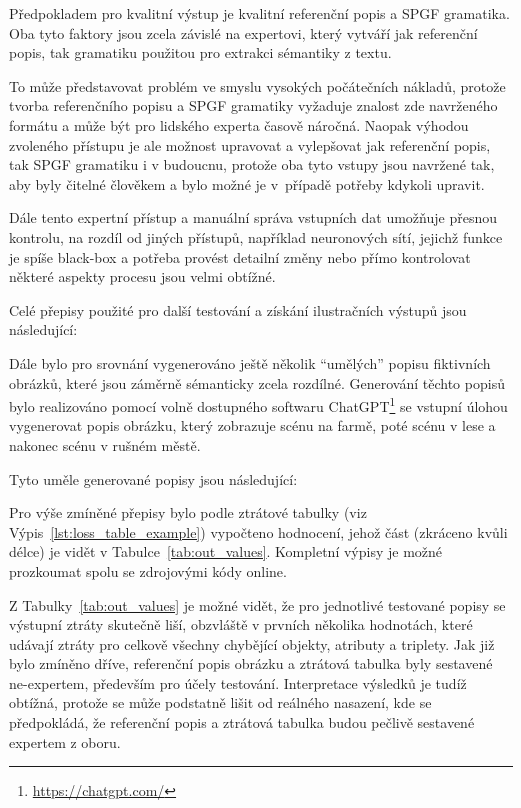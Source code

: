 Předpokladem pro kvalitní výstup je kvalitní referenční popis a SPGF gramatika.
Oba tyto faktory jsou zcela závislé na expertovi, který vytváří jak referenční popis, tak gramatiku použitou pro extrakci sémantiky z textu.

To může představovat problém ve smyslu vysokých počátečních nákladů, protože tvorba referenčního popisu a SPGF gramatiky
vyžaduje znalost zde navrženého formátu a může být pro lidského experta časově náročná.
Naopak výhodou zvoleného přístupu je ale možnost upravovat a vylepšovat jak referenční popis, tak SPGF gramatiku i v budoucnu,
protože oba tyto vstupy jsou navržené tak, aby byly čitelné člověkem a bylo možné je v~případě potřeby kdykoli upravit.

Dále tento expertní přístup a manuální správa vstupních dat umožňuje přesnou kontrolu, na rozdíl od jiných přístupů, například neuronových sítí, jejichž funkce je spíše black-box a
potřeba provést detailní změny nebo přímo kontrolovat některé aspekty procesu jsou velmi obtížné.

Celé přepisy použité pro další testování a získání ilustračních výstupů jsou následující:


Dále bylo pro srovnání vygenerováno ještě několik \enquote{umělých} popisu fiktivních obrázků,
které jsou záměrně sémanticky zcela rozdílné.
Generování těchto popisů bylo realizováno pomocí volně dostupného softwaru ChatGPT\footnote{\href{https://chatgpt.com/}{https://chatgpt.com/}} se vstupní úlohou
vygenerovat popis obrázku, který zobrazuje scénu na farmě, poté scénu v lese a nakonec scénu v rušném městě.

\newpage
Tyto uměle generované popisy jsou následující:


Pro výše zmíněné přepisy bylo podle ztrátové tabulky (viz Výpis~\ref{lst:loss_table_example}) vypočteno hodnocení,
jehož část (zkráceno kvůli délce) je vidět v Tabulce~\ref{tab:out_values}.
Kompletní výpisy je možné prozkoumat spolu se zdrojovými kódy online.

Z Tabulky~\ref{tab:out_values} je možné vidět, že pro jednotlivé testované popisy se výstupní ztráty skutečně liší, obzvláště v prvních několika
hodnotách, které udávají ztráty pro celkově všechny chybějící objekty, atributy a triplety.
Jak již bylo zmíněno dříve, referenční popis obrázku a ztrátová tabulka byly sestavené ne-expertem, především pro účely testování.
Interpretace výsledků je tudíž obtížná, protože se může podstatně lišit od reálného nasazení, kde se předpokládá, že referenční popis a
ztrátová tabulka budou pečlivě sestavené expertem z oboru.

